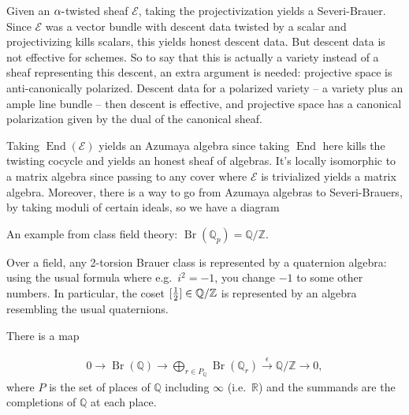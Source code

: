 \begin{remark}

Given an \(\alpha{\hbox{-}}\)twisted sheaf \(\mathcal{E}\), taking the
projectivization yields a Severi-Brauer. Since \(\mathcal{E}\) was a
vector bundle with descent data twisted by a scalar and projectivizing
kills scalars, this yields honest descent data. But descent data is not
effective for schemes. So to say that this is actually a variety instead
of a sheaf representing this descent, an extra argument is needed:
projective space is anti-canonically polarized. Descent data for a
polarized variety -- a variety plus an ample line bundle -- then descent
is effective, and projective space has a canonical polarization given by
the dual of the canonical sheaf.

Taking \(\operatorname{End}(\mathcal{E})\) yields an Azumaya algebra
since taking \(\operatorname{End}\) here kills the twisting cocycle and
yields an honest sheaf of algebras. It's locally isomorphic to a matrix
algebra since passing to any cover where \(\mathcal{E}\) is trivialized
yields a matrix algebra. Moreover, there is a way to go from Azumaya
algebras to Severi-Brauers, by taking moduli of certain ideals, so we
have a diagram

\end{remark}

\begin{example}[3]

An example from class field theory:
\(\operatorname{Br}({\mathbb{Q}}_{p}) = {\mathbb{Q}}/{\mathbb{Z}}\).

\end{example}

\begin{remark}

Over a field, any 2-torsion Brauer class is represented by a quaternion
algebra: using the usual formula where e.g.~\(i^{2} = -1\), you change
\(-1\) to some other numbers. In particular, the coset
\([{1\over 2}] \in {\mathbb{Q}}/{\mathbb{Z}}\) is represented by an
algebra resembling the usual quaternions.

\end{remark}

\begin{example}[?]

There is a map

\begin{align*}  
0 \xrightarrow{} \operatorname{Br}({\mathbb{Q}}) \xrightarrow{} \bigoplus_{r\in P_{{\mathbb{Q}}}} \operatorname{Br}({\mathbb{Q}}_{r})
\xrightarrow{\epsilon} {\mathbb{Q}}/{\mathbb{Z}}\xrightarrow{} 0 
,\end{align*}
where \(P\) is the set of places of \({\mathbb{Q}}\) including
\(\infty\) (i.e.~\({\mathbb{R}}\)) and the summands are the completions
of \({\mathbb{Q}}\) at each place.

\end{example}

